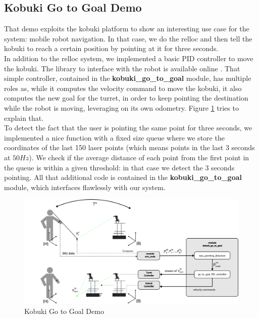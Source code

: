 \subsection{Kobuki Go to Goal Demo}\label{subs:kobukiGoToGoal}
That demo exploits the kobuki platform to show an interesting use case for the system: mobile robot navigation. In that case, we do the \ac{relloc} and then tell the kobuki to reach a certain position by pointing at it for three seconds.\\
In addition to the \ac{relloc} system, we implemented a basic \acs{PID} controller to move the kobuki. The library to interface with the robot is available online \cite{kobuki:ROS}. That simple controller, contained in the \textbf{kobuki\_go\_to\_goal} module, has multiple roles as, while it computes the velocity command to move the kobuki, it also computes the new goal for the turret, in order to keep pointing the destination while the robot is moving, leveraging on its own odometry. Figure \ref{fig:goToGoalDemo} tries to explain that.\\ 
To detect the fact that the user is pointing the same point for three seconds, we implemented a nice function with a fixed size queue where we store the coordinates of the last 150 laser points (which means points in the last $3$ seconds at $50Hz$). We check if the average distance of each point from the first point in the queue is within a given threshold: in that case we detect the 3 seconds pointing. All that additional code is contained in the \textbf{kobuki\_go\_to\_goal} module, which interfaces flawlessly with our system.
\begin{figure}
	\centering
	\includegraphics[width=.9\textwidth]{img/kgtgSW.png}%
	\caption{Kobuki Go to Goal Demo}
	\label{fig:goToGoalDemo}
\end{figure}

